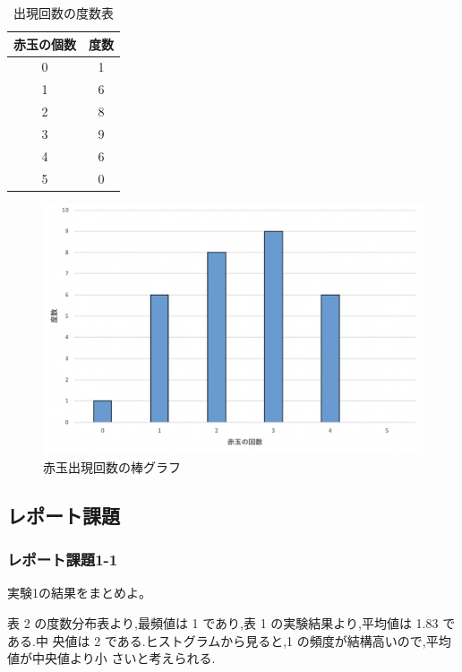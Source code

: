 \documentclass[12pt]{jarticle}
\begin{document}
\begin{table}
    \begin{center}
        \caption{出現回数の度数表}
        \begin{tabular}[h]{|c|c|}
            \hline
            赤玉の個数 & 度数 \\
            \hline
            0          & 1    \\
            1          & 6    \\
            2          & 8    \\
            3          & 9    \\
            4          & 6    \\
            5          & 0    \\
            \hline
        \end{tabular}
    \end{center}
\end{table}
\begin{figure}[h]
    \begin{center}
        \includegraphics[scale=0.9]{kadai4_1graph1.png}
    \end{center}
    \caption{赤玉出現回数の棒グラフ}
\end{figure}
\clearpage

\subsection{レポート課題}
\subsubsection*{レポート課題1-1}
\begin{shadebox}
    実験1の結果をまとめよ。
\end{shadebox}
表 2 の度数分布表より,最頻値は 1 であり,表 1 の実験結果より,平均値は 1.83 である.中
央値は 2 である.ヒストグラムから見ると,1 の頻度が結構高いので,平均値が中央値より小
さいと考えられる.
\end{document}
